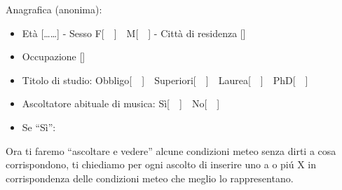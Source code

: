 \begin{compactenum}
	\item Anagrafica (anonima):
	\begin{itemize}
		\item Età [\dots\dots] - Sesso F[~~]~~M[~~] - Città di residenza [\dotfill]
		\item Occupazione [\dotfill]
		\item Titolo di studio: Obbligo[~~]~~Superiori[~~]~~Laurea[~~]~~PhD[~~]
		\item Ascoltatore abituale di musica: Sì[~~]~~No[~~]
		\item Se ``Sì'':
	
	\end{itemize}

	
	\item Ora ti faremo ``ascoltare e vedere'' alcune condizioni meteo senza dirti a cosa corrispondono, ti chiediamo per ogni ascolto di inserire uno a o piú X in corrispondenza delle condizioni meteo che meglio lo rappresentano. 
	

\end{compactenum}
